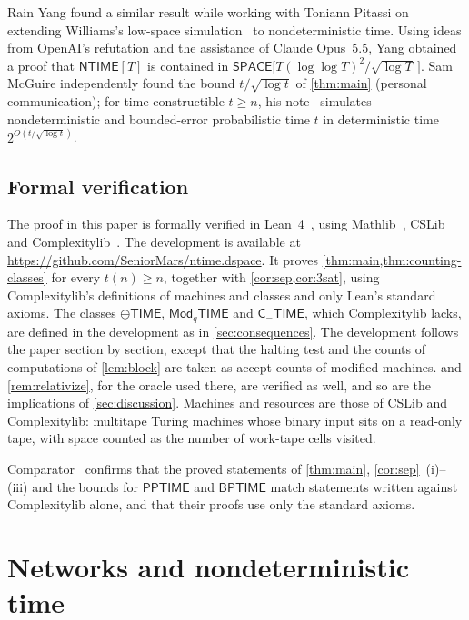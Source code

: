 \documentclass[11pt]{article}
\theoremstyle{definition}
\theoremstyle{definition}
\theoremstyle{remark}
\newcommand{\NTIME}{\mathsf{NTIME}}
\newcommand{\SPACE}{\mathsf{SPACE}}
\newcommand{\BPTIME}{\mathsf{BPTIME}}
\newcommand{\PPTIME}{\mathsf{PPTIME}}
\newcommand{\ParTIME}{\oplus\mathsf{TIME}}
\newcommand{\ModTIME}{\mathsf{Mod}_q\mathsf{TIME}}
\newcommand{\CeqTIME}{\mathsf{C}_{=}\mathsf{TIME}}
\begin{document}
Rain Yang found a similar result while working with Toniann Pitassi on extending Williams's low-space simulation~\cite{Wil25} to nondeterministic time. Using ideas from OpenAI's refutation and the assistance of Claude Opus~5.5, Yang obtained a proof that $\NTIME[T]$ is contained in $\SPACE\bigl[T(\log\log T)^2/\sqrt{\log T}\,\bigr]$. Sam McGuire independently found the bound $t/\sqrt{\log t}$ of \cref{thm:main} (personal communication); for time-constructible $t\ge n$, his note~\cite{McG26a} simulates nondeterministic and bounded-error probabilistic time $t$ in deterministic time $2^{O(t/\sqrt{\log t})}$.

\subsection{Formal verification}\label{sec:lean}

The proof in this paper is formally verified in Lean~4~\cite{dMU21}, using Mathlib~\cite{Mat20}, CSLib~\cite{CSL} and Complexitylib~\cite{Cplx}. The development is available at \url{https://github.com/SeniorMars/ntime.dspace}. It proves \cref{thm:main,thm:counting-classes} for every $t(n)\ge n$, together with \cref{cor:sep,cor:3sat}, using Complexitylib's definitions of machines and classes and only Lean's standard axioms. The classes $\ParTIME$, $\ModTIME$ and $\CeqTIME$, which Complexitylib lacks, are defined in the development as in \cref{sec:consequences}. The development follows the paper section by section, except that the halting test and the counts of computations of \cref{lem:block} are taken as accept counts of modified machines.  and \cref{rem:relativize}, for the oracle used there, are verified as well, and so are the implications of \cref{sec:discussion}. Machines and resources are those of CSLib and Complexitylib: multitape Turing machines whose binary input sits on a read-only tape, with space counted as the number of work-tape cells visited.

Comparator~\cite{Cmp} confirms that the proved statements of \cref{thm:main}, \cref{cor:sep}~(i)--(iii) and the bounds for $\PPTIME$ and $\BPTIME$ match statements written against Complexitylib alone, and that their proofs use only the standard axioms.

\section{Networks and nondeterministic time}\label{sec:networks}
\end{document}
